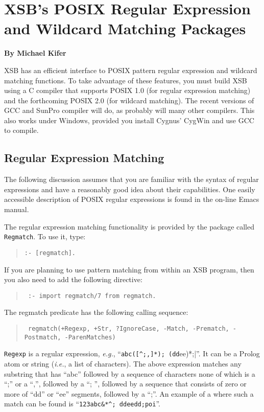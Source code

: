 \chapter{XSB's POSIX Regular Expression and Wildcard Matching Packages}

\begin{center}
{\Large {\bf By Michael Kifer}}
\end{center}

XSB has an efficient interface to POSIX pattern regular expression and
wildcard matching functions.  To take advantage of these features, you must
build XSB using a C compiler that supports POSIX 1.0 (for regular
expression matching) and the forthcoming POSIX 2.0 (for wildcard matching).
The recent versions of GCC and SunPro compiler will do, as probably will
many other compilers. This also works under Windows, provided you install
Cygnus' CygWin and use GCC to compile.

\section{Regular Expression Matching}

The following discussion assumes that you are familiar with the syntax of
regular expressions and have a reasonably good idea about their
capabilities. One easily accessible description of POSIX regular
expressions is found in the on-line Emacs manual.

The regular expression matching functionality is provided by the package
called {\tt Regmatch}. To use it, type:
\begin{quote}
 {\tt  :- [regmatch]. }
\end{quote}

If you are planning to use pattern matching from within an XSB program,
then you also need to add the following directive:
\begin{quote}
 \tt
 :- import regmatch/7 from regmatch.
\end{quote}

The regmatch predicate has the following calling sequence:
\begin{quote}
 \tt
 regmatch(+Regexp, +Str, ?IgnoreCase, -Match, -Prematch, -Postmatch, -ParenMatches)
\end{quote}
{\tt Regexp} is a regular expression, {\it e.g.},
``\verb|abc([^;,]*); (dd|ee)*;|''. It can be a Prolog atom or string ({\it i.e.}, a list of
characters). The above expression matches any substring that has ``abc''
followed by a sequence of characters none of which is a ``;'' or a ``,'',
followed by a ``; '', followed by a sequence that consists of zero or more
of ``dd'' or ``ee'' segments, followed by a ``;''. An example of a
where such a match can be found is ``\verb|123abc&*^; ddeedd;poi|''.

